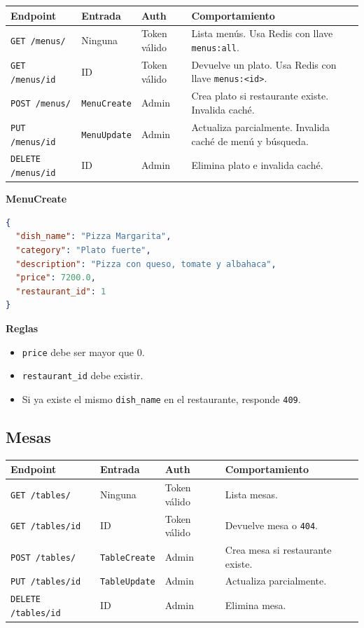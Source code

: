 \documentclass[12pt,letterpaper]{article}
\def\endpoint#1#2{\texttt{#1 #2}}
\def\codefile#1{\nolinkurl{#1}}
\begin{document}
\begin{longtable}{p{}p{}p{}p{}}
\toprule
\textbf{Endpoint} & \textbf{Entrada} & \textbf{Auth} & \textbf{Comportamiento}\\
\midrule
\endpoint{GET}{/menus/} & Ninguna & Token válido & Lista menús. Usa Redis con llave \codefile{menus:all}.\\
\endpoint{GET}{/menus/{id}} & ID & Token válido & Devuelve un plato. Usa Redis con llave \codefile{menus:<id>}.\\
\endpoint{POST}{/menus/} & \codefile{MenuCreate} & Admin & Crea plato si restaurante existe. Invalida caché.\\
\endpoint{PUT}{/menus/{id}} & \codefile{MenuUpdate} & Admin & Actualiza parcialmente. Invalida caché de menú y búsqueda.\\
\endpoint{DELETE}{/menus/{id}} & ID & Admin & Elimina plato e invalida caché.\\
\bottomrule
\end{longtable}

\textbf{MenuCreate}
\begin{lstlisting}[language=json]
{
  "dish_name": "Pizza Margarita",
  "category": "Plato fuerte",
  "description": "Pizza con queso, tomate y albahaca",
  "price": 7200.0,
  "restaurant_id": 1
}
\end{lstlisting}

\textbf{Reglas}
\begin{itemize}
    \item \codefile{price} debe ser mayor que 0.
    \item \codefile{restaurant\_id} debe existir.
    \item Si ya existe el mismo \codefile{dish\_name} en el restaurante, responde \codefile{409}.
\end{itemize}

\subsection{Mesas}

\begin{longtable}{p{}p{}p{}p{}}
\toprule
\textbf{Endpoint} & \textbf{Entrada} & \textbf{Auth} & \textbf{Comportamiento}\\
\midrule
\endpoint{GET}{/tables/} & Ninguna & Token válido & Lista mesas.\\
\endpoint{GET}{/tables/{id}} & ID & Token válido & Devuelve mesa o \codefile{404}.\\
\endpoint{POST}{/tables/} & \codefile{TableCreate} & Admin & Crea mesa si restaurante existe.\\
\endpoint{PUT}{/tables/{id}} & \codefile{TableUpdate} & Admin & Actualiza parcialmente.\\
\endpoint{DELETE}{/tables/{id}} & ID & Admin & Elimina mesa.\\
\bottomrule
\end{longtable}
\end{document}
